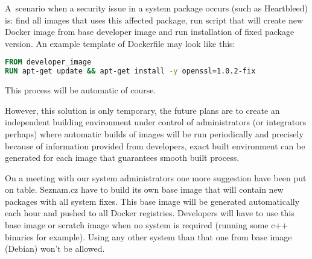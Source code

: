A~scenario when a security issue in a system package occurs (such as Heartbleed) is: find all images that uses this affected package, run script that will create new Docker image from base developer image and run installation of fixed package version. An example template of Dockerfile may look like this:

\begin{lstlisting}[language=dockerfile,caption=Dockerfile snippet]
FROM developer_image
RUN apt-get update && apt-get install -y openssl=1.0.2-fix
\end{lstlisting}

This process will be automatic of course.

However, this solution is only temporary, the future plans are to create an independent building environment under control of administrators (or integrators perhaps) where automatic builds of images will be run periodically and precisely because of information provided from developers, exact built environment can be generated for each image that guarantees smooth built process.

On a meeting with our system administrators one more suggestion have been put on table. Seznam.cz have to build its own base image that will contain new packages with all system fixes. This base image will be generated automatically each hour and pushed to all Docker registries. Developers will have to use this base image or scratch image when no system is required (running some c++ binaries for example). Using any other system than that one from base image (Debian) won’t be allowed.

